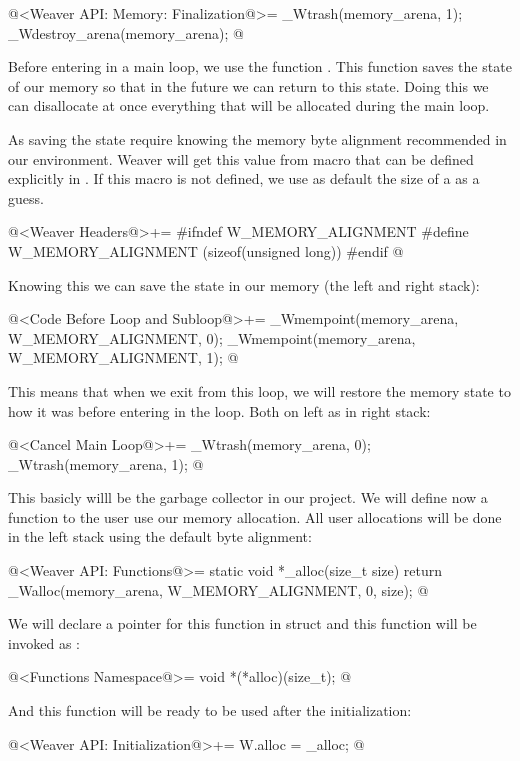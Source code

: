 \iniciocodigo
  @<Weaver API: Memory: Finalization@>=
_Wtrash(memory_arena, 1);
_Wdestroy_arena(memory_arena);
@
\fimcodigo

Before entering in a main loop, we use the
function . This function saves the state of
our memory so that in the future we can return to this state. Doing
this we can disallocate at once everything that will be allocated
during the main loop.

As saving the state require knowing the memory byte alignment
recommended in our environment. Weaver will get this value from
macro  that can be defined explicitly
in . If this macro is not defined, we use as
default the size of a  as a guess.

\iniciocodigo
@<Weaver Headers@>+=
#ifndef W_MEMORY_ALIGNMENT
#define W_MEMORY_ALIGNMENT (sizeof(unsigned long))
#endif
@
\fimcodigo

Knowing this we can save the state in our memory (the left and right
stack):

\iniciocodigo
@<Code Before Loop and Subloop@>+=
_Wmempoint(memory_arena, W_MEMORY_ALIGNMENT, 0);
_Wmempoint(memory_arena, W_MEMORY_ALIGNMENT, 1);
@
\fimcodigo

This means that when we exit from this loop, we will restore the
memory state to how it was before entering in the loop. Both on left
as in right stack:

\iniciocodigo
@<Cancel Main Loop@>+=
_Wtrash(memory_arena, 0);
_Wtrash(memory_arena, 1);
@
\fimcodigo

This basicly willl be the garbage collector in our project. We will
define now a function to the user use our memory allocation. All user
allocations will be done in the left stack using the default byte
alignment:

\iniciocodigo

@<Weaver API: Functions@>=
static void *_alloc(size_t size){
  return _Walloc(memory_arena, W_MEMORY_ALIGNMENT, 0, size);
}
@
\fimcodigo

We will declare a pointer for this function in struct 
and this function will be invoked as :

\iniciocodigo
@<Functions Namespace@>=
void *(*alloc)(size_t);
@
\fimcodigo

And this function will be ready to be used after the initialization:

\iniciocodigo
@<Weaver API: Initialization@>+=
W.alloc = _alloc;
@
\fimcodigo

